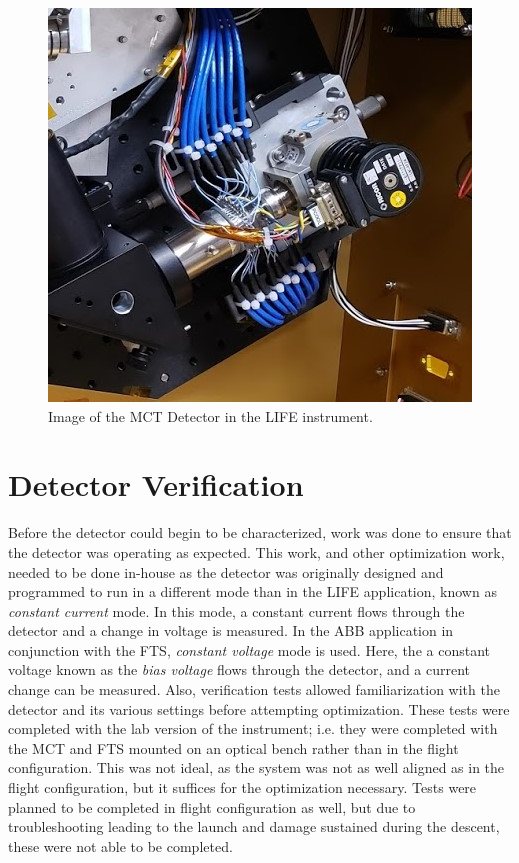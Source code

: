 \begin{figure}[h]
  \centering
  \includegraphics[width=0.6\linewidth]{chap5_images/detector_in_LIFE.jpg}
  \caption{Image of the MCT Detector in the LIFE instrument.}
  \label{fig:life_detector_from_ICD}
\end{figure}

\section{Detector Verification}\label{detector_verif}
Before the detector could begin to be characterized, work was done to ensure that the detector was operating as expected. This work, and other optimization work, needed to be done in-house as the detector was originally designed and programmed to run in a different mode than in the LIFE application, known as \textit{constant current} mode. In this mode, a constant current flows through the detector and a change in voltage is measured. In the ABB application in conjunction with the FTS, \textit{constant voltage} mode is used. Here, the a constant voltage known as the \textit{bias voltage} flows through the detector, and a current change can be measured. Also, verification tests allowed familiarization with the detector and its various settings before attempting optimization. These tests were completed with the lab version of the instrument; i.e. they were completed with the MCT and FTS mounted on an optical bench rather than in the flight configuration. This was not ideal, as the system was not as well aligned as in the flight configuration, but it suffices for the optimization necessary. Tests were planned to be completed in flight configuration as well, but due to troubleshooting leading to the launch and damage sustained during the descent, these were not able to be completed.

